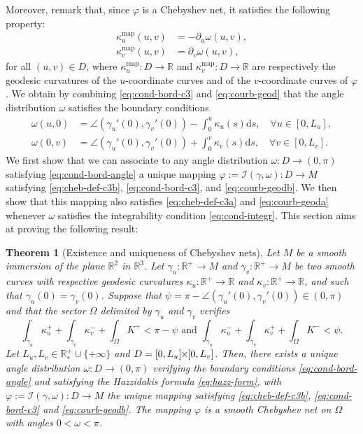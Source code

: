 \documentclass{article}
\newcommand{\I}{\mathcal{I}}
\newcommand{\PLH}{{\mkern-1mu\times\mkern-1mu}}
\newcommand{\Times}{\PLH}
\newcommand{\R}{\mathbb{R}}
\newcommand{\surf}{M}
\newcommand{\ko}{\kappa}
\newcommand{\kop}{\kappa^{\mathrm{map}}}
\newcommand{\ds}{\mathrm{d}s}
\newtheorem{theorem}{Theorem}
\theoremstyle{remark}
\theoremstyle{prpart}
\begin{document}
Moreover, remark that, since $\varphi$ is a Chebyshev net, it satisfies the following property:
\begin{subequations}\label{eq:courb-geod}
\begin{align}\label{eq:courb-geoda}
\kop_u(u,v) &= -\partial_u\omega(u,v), \\\label{eq:courb-geodb}
\kop_v(u,v) &= \partial_v\omega(u,v),
\end{align}
\end{subequations}
for all $(u,v)\in D$, where $\kop_u:D\to\R$ and $\kop_v:D\to\R$ are respectively the geodesic curvatures of the $u$-coordinate curves and of the $v$-coordinate curves of $\varphi$. We obtain by combining \eqref{eq:cond-bord-c3} and \eqref{eq:courb-geod} that the angle distribution $\omega$ satisfies the boundary conditions
\begin{subequations}\label{eq:cond-bord-angle}
\begin{align}
\omega(u, 0) &= \angle(\gamma_u'(0), \gamma_v'(0)) - \int_0^u\ko_u(s)\ds,\quad\forall u\in[0,L_u],\\
\omega(0,v) &= \angle(\gamma_u'(0), \gamma_v'(0)) + \int_0^v\ko_v(s)\ds,\quad\forall v\in[0,L_v].
\end{align}
\end{subequations}
We first show that we can associate to any angle distribution
$\omega:D\to(0,\pi)$ satisfying \eqref{eq:cond-bord-angle} a unique
mapping $\varphi:=\I(\gamma,\omega):D\to\surf$ satisfying
\eqref{eq:cheb-def-c3b}, \eqref{eq:cond-bord-c3}, and
\eqref{eq:courb-geodb}. We then show that this mapping also satisfies
\eqref{eq:cheb-def-c3a} and \eqref{eq:courb-geoda} whenever $\omega$
satisfies the integrability condition \eqref{eq:cond-integr}. This
section aims at proving the following result:
\begin{theorem}[Existence and uniqueness of Chebyshev nets]\label{thm2full}
Let $\surf$ be a smooth immersion of the plane $\R^2$ in $\R^3$. Let
$\gamma_u:\R^+\to\surf$ and $\gamma_v:\R^+\to\surf$ be two smooth
curves with respective geodesic curvatures $\ko_u:\R^+\to\R$ and
$\ko_v:\R^+\to\R$, and such that $\gamma_u(0) = \gamma_v(0)$. Suppose
that $\psi=\pi-\angle(\gamma_u'(0),\gamma_v'(0))\in(0,\pi)$ and that
the sector $\Omega$ delimited by $\gamma_u$ and $\gamma_v$
verifies \[\int_{\gamma_u}{\ko_u^+} + \int_{\gamma_v}{\ko_v^-} +
\int_{\Omega}{K^+}<\pi-\psi \text{ and } \int_{\gamma_u}{\ko_u^-} +
\int_{\gamma_v}{\ko_v^+} + \int_{\Omega}{K^-}<\psi.\] Let
$L_u,L_v\in\R_\ast^+\cup\{+\infty\}$ and
$D=[0,L_u]\Times[0,L_v]$. Then, there exists a unique angle
distribution $\omega:D\to(0,\pi)$ verifying the boundary conditions
\eqref{eq:cond-bord-angle} and satisfying the Hazzidakis formula
\eqref{eq:hazz-form}, with $\varphi:=\I(\gamma,\omega): D\to\surf$ the
unique mapping satisfying \eqref{eq:cheb-def-c3b},
\eqref{eq:cond-bord-c3} and \eqref{eq:courb-geodb}. The mapping
$\varphi$ is a smooth Chebyshev net on $\Omega$ with angles
$0<\omega<\pi$.
\end{theorem}
\end{document}
